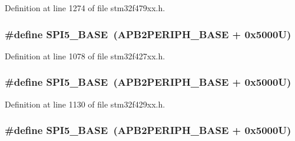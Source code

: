 Definition at line 1274 of file stm32f479xx.\+h.

\subsubsection[{\texorpdfstring{S\+P\+I5\+\_\+\+B\+A\+SE}{SPI5_BASE}}]{\setlength{\rightskip}{0pt plus 5cm}\#define S\+P\+I5\+\_\+\+B\+A\+SE~({\bf A\+P\+B2\+P\+E\+R\+I\+P\+H\+\_\+\+B\+A\+SE} + 0x5000\+U)}\hypertarget{group___peripheral__memory__map_gac1c58d33414e167d478ecd0e31331dfa}{}\label{group___peripheral__memory__map_gac1c58d33414e167d478ecd0e31331dfa}


Definition at line 1078 of file stm32f427xx.\+h.

\subsubsection[{\texorpdfstring{S\+P\+I5\+\_\+\+B\+A\+SE}{SPI5_BASE}}]{\setlength{\rightskip}{0pt plus 5cm}\#define S\+P\+I5\+\_\+\+B\+A\+SE~({\bf A\+P\+B2\+P\+E\+R\+I\+P\+H\+\_\+\+B\+A\+SE} + 0x5000\+U)}\hypertarget{group___peripheral__memory__map_gac1c58d33414e167d478ecd0e31331dfa}{}\label{group___peripheral__memory__map_gac1c58d33414e167d478ecd0e31331dfa}


Definition at line 1130 of file stm32f429xx.\+h.

\subsubsection[{\texorpdfstring{S\+P\+I5\+\_\+\+B\+A\+SE}{SPI5_BASE}}]{\setlength{\rightskip}{0pt plus 5cm}\#define S\+P\+I5\+\_\+\+B\+A\+SE~({\bf A\+P\+B2\+P\+E\+R\+I\+P\+H\+\_\+\+B\+A\+SE} + 0x5000\+U)}\hypertarget{group___peripheral__memory__map_gac1c58d33414e167d478ecd0e31331dfa}{}\label{group___peripheral__memory__map_gac1c58d33414e167d478ecd0e31331dfa}


